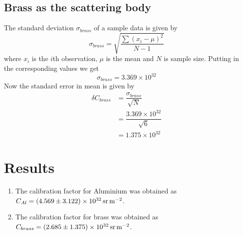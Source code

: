 \documentclass[%
 reprint,
nofootinbib,
 amsmath,amssymb,
 aps,
floatfix,
]{revtex4-2}
\begin{document}
    \subsection{Brass as the scattering body}
    The standard deviation $\sigma_{brass}$ of a sample data is given by
    \begin{equation}
        \sigma_{brass} = \sqrt{\dfrac{\sum (x_i - \mu)^2}{N-1}}
    \end{equation}
    where $x_i$ is the $i$th observation, $\mu$ is the mean and $N$ is sample size. Putting in the corresponding values we get
    \begin{equation}
        \sigma_{brass} = 3.369 \times 10^{32}
    \end{equation}
    Now the standard error in mean is given by
    \begin{equation}
        \begin{split}
            \delta C_{brass} &= \dfrac{\sigma_{brass}}{\sqrt{N}} \\
            &= \dfrac{3.369 \times 10^{32}}{\sqrt{6}} \\
            &= \boxed{1.375 \times 10^{32}}
        \end{split}
    \end{equation}

\section{Results}
    \begin{enumerate}
        \item The calibration factor for Aluminium was obtained as $C_{Al} = \SI[separate-uncertainty=true]{4.569 \pm 3.122e32}{\steradian \per \metre \squared}$.
        \item The calibration factor for brass was obtained as $C_{brass} = \SI[separate-uncertainty=true]{2.685 \pm 1.375e32}{\steradian \per \metre \squared}$.
    \end{enumerate}
    
\end{document}
